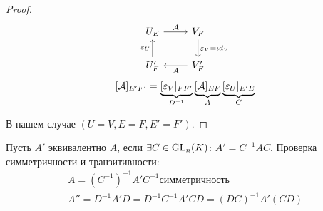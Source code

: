 \documentclass[main]{subfiles}
\begin{document}
\begin{proof}
        \[\begin{tikzcd}[ampersand replacement=\&]
            {U_E} \& {V_F} \\
            {U_F'} \& {V_F'}
            \arrow["{\epsilon_V=id_V}", from=1-2, to=2-2]
            \arrow["{\mca}", from=2-2, to=2-1]
            \arrow["{\epsilon_U}", from=2-1, to=1-1]
            \arrow["{\mca}", from=1-1, to=1-2]
        \end{tikzcd}\]
        \[[\mathcal{A}]_{E'F'}=\underbrace{[\varepsilon_V]_{FF'}}_{D^{-1}}\underbrace{[\mathcal{A}]_{EF}}_{A}\underbrace{[\varepsilon_U]_{E'E}}_{C}\]
    
    В нашем случае $(U=V, E=F, E'=F')$.
\end{proof}

\begin{definition} [Алгебра]
    Пусть $A'$ эквивалентно $A$, если $\exists C \in \operatorname{GL}_n(K)$: $A'=C^{-1}AC$. 
    Проверка симметричности и транзитивности:
    \begin{gather*} 
        A= (C^{-1})^{-1}A'C^{-1} симметричность \\
        A'' = D^{-1}A'D=D^{-1}C^{-1}A'CD=(DC)^{-1}A'(CD)  \\
    \end{gather*}
\end{definition}

 
\end{document}
